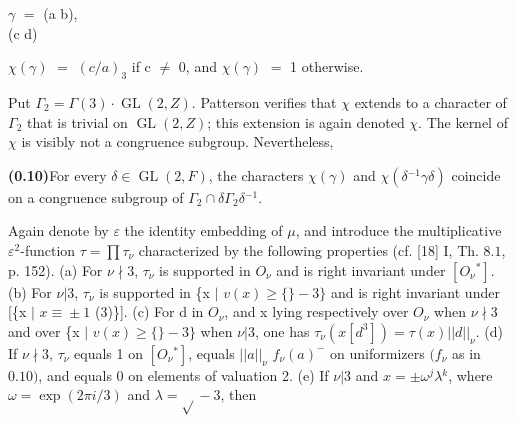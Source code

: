 \documentclass[10pt,a4paper]{article}
\begin{document}
\clearpage
{}
\label{d035-physical-005}
\par\smallskip\begin{center}\begin{minipage}{0.96\textwidth}\centering
$\gamma{}$ $=$ (a b), \\ (c d)
\end{minipage}\end{center}\smallskip
\par\smallskip\begin{center}\begin{minipage}{0.96\textwidth}\centering
$\chi{}(\gamma{})$ $=$ $(c/a)_3$ if c $\ne{}$ 0, and $\chi{}(\gamma{})$ $=$ 1 otherwise.
\end{minipage}\end{center}\smallskip
\par Put $\Gamma{}_2=\Gamma{}(3)\cdot{}\operatorname{GL}(2,Z)$. Patterson verifies that $\chi{}$ extends to a character of $\Gamma{}_2$ that is trivial on $\operatorname{GL}(2,Z)$; this extension is again denoted $\chi{}$. The kernel of $\chi{}$ is visibly not a congruence subgroup. Nevertheless,\par
\par\noindent\textbf{(0.10)}\quad For every $\delta{}\in{}\operatorname{GL}(2,F)$, the characters $\chi{}(\gamma{})$ and $\chi{}(\delta{}^{-1}\gamma{}\delta{})$ coincide on a congruence subgroup of $\Gamma{}_2\cap{}\delta{}\Gamma{}_2\delta{}^{-1}$.\par
\par Again denote by $\varepsilon{}$ the identity embedding of $\mu{}$, and introduce the multiplicative $\varepsilon{}^2$-function $\tau{}=\prod{}\tau{}_\nu{}$ characterized by the following properties (cf. [18] I, Th. $8.1$, p. 152). (a) For $\nu{}\nmid{}3$, $\tau{}_\nu{}$ is supported in $O_\nu{}$ and is right invariant under $[O_\nu{}^*]$. (b) For $\nu{}|3$, $\tau{}_\nu{}$ is supported in \{x $|$ $v(x)\ge\{\}-3\}$ and is right invariant under [\{x $|$ $x\equiv{}\pm{}1$ (3)\}]. (c) For d in $O_\nu{}$, and x lying respectively over $O_\nu{}$ when $\nu{}\nmid{}3$ and over \{x $|$ $v(x)\ge\{\}-3\}$ when $\nu{}|3$, one has $\tau{}_\nu{}(x[d^3])=\tau{}(x)||d||_\nu{}$. (d) If $\nu{}\nmid{}3$, $\tau{}_\nu{}$ equals 1 on $[O_\nu{}^*]$, equals $||a||_\nu{}$ $f_\nu{}(a)^{-}$ on uniformizers $(f_\nu{}$ as in $0.10)$, and equals 0 on elements of valuation 2. (e) If $\nu{}|3$ and $x=\pm{}\omega{}^j\lambda{}^k$, where $\omega{}=\exp(2\pi{}i/3)$ and $\lambda{}=\sqrt{}-3$, then\par
\end{document}
